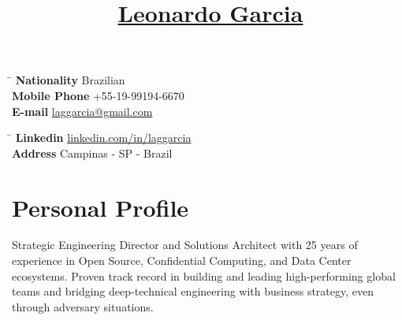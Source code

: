 \documentclass[10pt]{article} %
\begin{document}
%


\title{\href{https://br.linkedin.com/in/laggarcia}{Leonardo Garcia}} %
\noindent
\begin{minipage}[t]{0.5\textwidth} %
\begin{tabbing} %
\hspace{3cm} \= \kill %
{\bf Nationality} \> Brazilian \\ %
{\bf Mobile Phone} \> +55-19-99194-6670 \\ %
{\bf E-mail} \> \href{mailto:laggarcia@gmail.com}{laggarcia@gmail.com} %
\end{tabbing}
\end{minipage}
\hfill %
\begin{minipage}[t]{0.5\textwidth} %
\begin{tabbing} %
\hspace{2.5cm} \= \kill %
{\bf Linkedin} \> \href{https://br.linkedin.com/in/laggarcia}{linkedin.com/in/laggarcia} \\
{\bf Address} \> Campinas - SP - Brazil %
\end{tabbing}%
\end{minipage}


\section{Personal Profile}

Strategic Engineering Director and Solutions Architect with 25 years of experience in Open Source, Confidential Computing, and Data Center ecosystems. Proven track record in building and leading high-performing global teams and bridging deep-technical engineering with business strategy, even through adversary situations.

\end{document}
